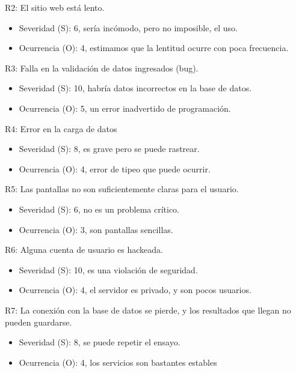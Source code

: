 \documentclass[11pt]{charter}
\begin{document}
R2: El sitio web está lento.
\begin{itemize}
\item Severidad (S): 6, sería incómodo, pero no imposible, el uso.
\item Ocurrencia (O): 4, estimamos que la lentitud ocurre con poca frecuencia.
\end{itemize}

R3: Falla en la validación de datos ingresados (bug).
\begin{itemize}
\item Severidad (S): 10, habría datos incorrectos en la base de datos. 
\item Ocurrencia (O): 5, un error inadvertido de programación.
\end{itemize}

R4: Error en la carga de datos
\begin{itemize}
\item Severidad (S): 8, es grave pero se puede rastrear.
\item Ocurrencia (O): 4, error de tipeo que puede ocurrir.
\end{itemize}

R5: Las pantallas no son suficientemente claras para el usuario.
\begin{itemize}
\item Severidad (S): 6, no es un problema crítico.
\item Ocurrencia (O): 3, son pantallas sencillas.
\end{itemize}

R6: Alguna cuenta de usuario es hackeada.
\begin{itemize}
\item Severidad (S): 10, es una violación de seguridad.
\item Ocurrencia (O): 4, el servidor es privado, y son pocos usuarios.
\end{itemize}

R7: La conexión con la base de datos se pierde, y los resultados que llegan no pueden guardarse.
\begin{itemize}
\item Severidad (S): 8, se puede repetir el ensayo.
\item Ocurrencia (O): 4, los servicios son bastantes estables
\end{itemize}
\end{document}
